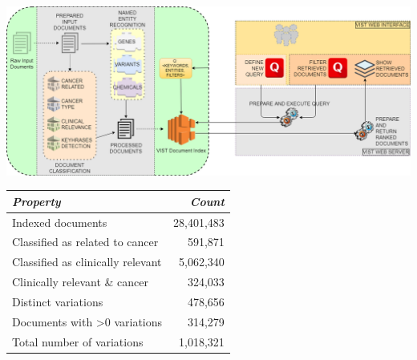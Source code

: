 \documentclass[fleqn,10pt]{wlscirep}
\begin{document}
\begin{minipage}{\linewidth}
	\begin{minipage}[b]{0.45\linewidth}
	\includegraphics[width=\linewidth]{img/vist_backend.png}    
	\label{img:docDetails}
	\end{minipage}
	\hspace{0.3cm}
	\begin{minipage}[b]{0.45\linewidth}
	\begin{tabular}{@{}|l|r|@{}}
	\toprule
	\textit{\textbf{Property}}               & \textit{\textbf{Count}} \\ \midrule
	Indexed documents                        & 28,401,483              \\ \midrule
	Classified as related to cancer          & 591,871                 \\ \midrule
	Classified as clinically relevant        & 5,062,340               \\ \midrule
	Clinically relevant \& cancer            & 324,033                 \\ \midrule
	Distinct variations                      & 478,656                 \\ \midrule
	Documents with \textgreater 0 variations & 314,279                 \\ \midrule
	Total number of variations               & 1,018,321               \\ \bottomrule
	\end{tabular}
	\label{tab:vist_index}
	\end{minipage}
\end{minipage}
\end{document}
